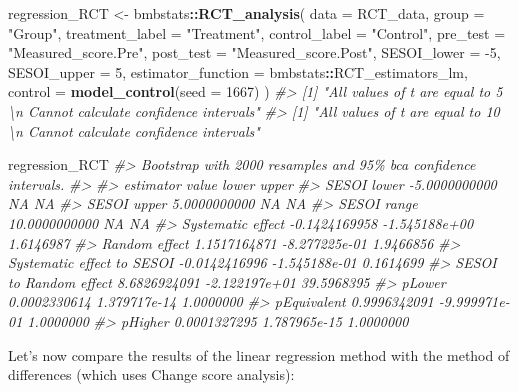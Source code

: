 \documentclass[
]{book}
\newenvironment{Shaded}{\begin{snugshade}}{\end{snugshade}}
\newcommand{\CommentTok}[1]{\textcolor[rgb]{0.56,0.35,0.01}{\textit{#1}}}
\newcommand{\DataTypeTok}[1]{\textcolor[rgb]{0.13,0.29,0.53}{#1}}
\newcommand{\DecValTok}[1]{\textcolor[rgb]{0.00,0.00,0.81}{#1}}
\newcommand{\KeywordTok}[1]{\textcolor[rgb]{0.13,0.29,0.53}{\textbf{#1}}}
\newcommand{\NormalTok}[1]{#1}
\newcommand{\OperatorTok}[1]{\textcolor[rgb]{0.81,0.36,0.00}{\textbf{#1}}}
\newcommand{\StringTok}[1]{\textcolor[rgb]{0.31,0.60,0.02}{#1}}
\begin{document}
\begin{Shaded}
\begin{Highlighting}[]
\NormalTok{regression\_RCT <{-}}\StringTok{ }\NormalTok{bmbstats}\OperatorTok{::}\KeywordTok{RCT\_analysis}\NormalTok{(}
  \DataTypeTok{data =}\NormalTok{ RCT\_data,}
  \DataTypeTok{group =} \StringTok{"Group"}\NormalTok{,}
  \DataTypeTok{treatment\_label =} \StringTok{"Treatment"}\NormalTok{,}
  \DataTypeTok{control\_label =} \StringTok{"Control"}\NormalTok{,}
  \DataTypeTok{pre\_test =} \StringTok{"Measured\_score.Pre"}\NormalTok{,}
  \DataTypeTok{post\_test =} \StringTok{"Measured\_score.Post"}\NormalTok{,}
  \DataTypeTok{SESOI\_lower =} \DecValTok{{-}5}\NormalTok{,}
  \DataTypeTok{SESOI\_upper =} \DecValTok{5}\NormalTok{,}
  \DataTypeTok{estimator\_function =}\NormalTok{ bmbstats}\OperatorTok{::}\NormalTok{RCT\_estimators\_lm,}
  \DataTypeTok{control =} \KeywordTok{model\_control}\NormalTok{(}\DataTypeTok{seed =} \DecValTok{1667}\NormalTok{)}
\NormalTok{)}
\CommentTok{\#> [1] "All values of t are equal to  5 \textbackslash{}n Cannot calculate confidence intervals"}
\CommentTok{\#> [1] "All values of t are equal to  10 \textbackslash{}n Cannot calculate confidence intervals"}


\NormalTok{regression\_RCT}
\CommentTok{\#> Bootstrap with 2000 resamples and 95\% bca confidence intervals.}
\CommentTok{\#> }
\CommentTok{\#>                   estimator         value         lower      upper}
\CommentTok{\#>                 SESOI lower {-}5.0000000000            NA         NA}
\CommentTok{\#>                 SESOI upper  5.0000000000            NA         NA}
\CommentTok{\#>                 SESOI range 10.0000000000            NA         NA}
\CommentTok{\#>           Systematic effect {-}0.1424169958 {-}1.545188e+00  1.6146987}
\CommentTok{\#>               Random effect  1.1517164871 {-}8.277225e{-}01  1.9466856}
\CommentTok{\#>  Systematic effect to SESOI {-}0.0142416996 {-}1.545188e{-}01  0.1614699}
\CommentTok{\#>      SESOI to Random effect  8.6826924091 {-}2.122197e+01 39.5968395}
\CommentTok{\#>                      pLower  0.0002330614  1.379717e{-}14  1.0000000}
\CommentTok{\#>                 pEquivalent  0.9996342091 {-}9.999971e{-}01  1.0000000}
\CommentTok{\#>                     pHigher  0.0001327295  1.787965e{-}15  1.0000000}
\end{Highlighting}
\end{Shaded}

Let's now compare the results of the linear regression method with the method of differences (which uses Change score analysis):
\end{document}
